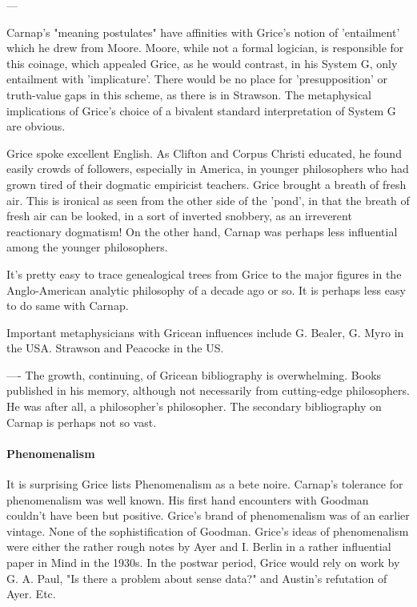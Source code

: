 \documentclass[10pt,titlepage]{book}
\begin{document}
{---
 
Carnap's "meaning postulates" have affinities with Grice's notion of  
'entailment' which he drew from Moore. Moore, while not a formal logician, is  
responsible for this coinage, which appealed Grice, as he would contrast, in 
his  System G, only entailment with 'implicature'. There would be no place 
for  'presupposition' or truth-value gaps in this scheme, as there is in 
Strawson.  The metaphysical implications of Grice's choice of a bivalent standard 
 interpretation of System G are obvious.
 
Grice spoke excellent English. As Clifton and Corpus Christi educated, he  
found easily crowds of followers, especially in America, in younger 
philosophers  who had grown tired of their dogmatic empiricist teachers. Grice 
brought a  breath of fresh air. This is ironical as seen from the other side of 
the 'pond',  in that the breath of fresh air can be looked, in a sort of 
inverted snobbery,  as an irreverent reactionary dogmatism!  On the other hand, 
Carnap was  perhaps less influential among the younger philosophers. 
 
It's pretty easy to trace genealogical trees from Grice to the major  
figures in the Anglo-American analytic philosophy of a decade ago or so. It is  
perhaps less easy to do same with Carnap.
 
Important metaphysicians with Gricean influences include G. Bealer, G. Myro 
 in the USA. Strawson and Peacocke in the US.
 
---- The growth, continuing, of Gricean bibliography is overwhelming. Books 
 published in his memory, although not necessarily from cutting-edge  
philosophers. He was after all, a philosopher's philosopher. The secondary  
bibliography on Carnap is perhaps not so vast.

\paragraph{Phenomenalism}

It is surprising Grice lists Phenomenalism as a bete 
noire. Carnap's tolerance  for phenomenalism was well known. His first hand 
encounters with Goodman  couldn't have been but positive. Grice's brand of 
phenomenalism was of an  earlier vintage. None of the sophistification of 
Goodman. Grice's ideas of  phenomenalism were either the rather rough notes by Ayer 
and I. Berlin in a  rather influential paper in Mind in the 1930s. In the 
postwar period, Grice  would rely on work by G. A. Paul, "Is there a problem 
about sense data?" and  Austin's refutation of Ayer. Etc. 

}
\end{document}
